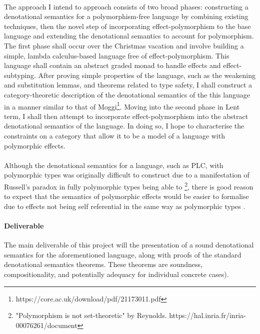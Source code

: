 \documentclass[11pt]{article}
\begin{document}
\paragraph{}{
The approach I intend to approach consists of two broad phases: constructing a denotational semantics for a polymorphism-free language by combining existing techniques, then the novel step of incorporating effect-polymorphism to the base language and extending the denotational semantics to account for polymorphism. The first phase shall occur over the Christmas vacation and involve building a simple, lambda calculus-based language free of effect-polymorphism. This language shall contain an abstract graded monad to handle effects and effect-subtyping. After proving simple properties of the language, such as the weakening and substitution lemmas, and theorems related to type safety, I shall construct a category-theoretic description of the denotational semantics of the this language in a manner similar to that of Moggi\footnote{https://core.ac.uk/download/pdf/21173011.pdf}. Moving into the second phase in Lent term, I shall then attempt to incorporate effect-polymorphism into the abstract denotational semantics of the language. In doing so, I hope to characterise the constraints on a category that allow it to be a model of a language with polymorphic effects.
}

\paragraph{}{
Although the denotational semantics for a language, such as PLC, with polymorphic types was originally difficult to construct due to a manifestation of Russell's paradox in fully polymorphic types being able to \footnote{"Polymorphism
is not set-theoretic" by Reynolds. https://hal.inria.fr/inria-00076261/document}, there is good reason to expect that the semantics of polymorphic effects would be easier to formalise due to effects not being self referential in the same way as polymorphic types .
}




\paragraph{Deliverable}{
The main deliverable of this project will the presentation of a sound denotational semantics for the aforementioned language, along with proofs of the standard denotational semantics theorems. These theorems are soundness, compositionality, and potentially adequacy for individual concrete cases).
}
\end{document}
